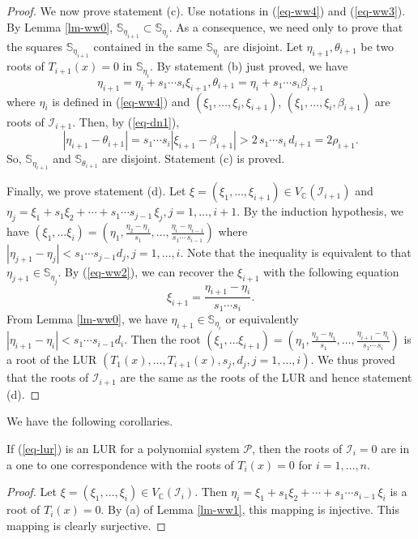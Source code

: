 \documentclass[amsthm]{JSC_LaTex_2007_Mar_12/elsart}
\def\bref#1{(\ref{#1})}
\def\C{{\mathbb{C}}}
\def\PS{ {\mathcal{P}} }
\def\IS{{\mathcal{I}}}
\begin{document}
\begin{proof}
We now prove statement (c).
Use notations in \bref{eq-ww4} and \bref{eq-ww3}. By Lemma
\ref{lm-ww0}, $\mathbb{S}_{\eta_{i+1}}\subset
\mathbb{S}_{\eta_{i}}$.
As a consequence, we need only to prove that the squares
$\mathbb{S}_{\eta_{i+1}}$ contained in the same
$\mathbb{S}_{\eta_{i}}$ are disjoint. Let $\eta_{i+1}, \theta_{i+1}$
be two roots of $T_{i+1}(x)=0$ in $\mathbb{S}_{\eta_{i}}$. By
statement (b) just proved, we have
$$ \eta_{i+1}= \eta_i+s_1\cdots s_{i}\xi_{i+1},
   \theta_{i+1}=\eta_i +s_1\cdots s_{i}\beta_{i+1}$$
where $\eta_i$ is defined in \bref{eq-ww4} and
$(\xi_1,\ldots,\xi_i,\xi_{i+1})$, $(\xi_1,\ldots,\xi_i,\beta_{i+1})$
are roots of $\IS_{i+1}$.   Then, by \bref{eq-dn1},
$$|\eta_{i+1}-\theta_{i+1}|=s_1\cdots s_{i}|\xi_{i+1}-\beta_{i+1}|>2\,s_1\cdots s_{i}\,d_{i+1} = 2\rho_{i+1}.$$
So, $\mathbb{S}_{\eta_{i+1}}$ and $\mathbb{S}_{\theta_{i+1}}$ are
disjoint. Statement (c) is proved.

Finally, we prove statement (d). Let
$\xi=(\xi_1,\ldots,\xi_{i+1})\in V_{\C}(\IS_{i+1})$ and
$\eta_{j}=\xi_1+s_1\xi_2+\cdots+s_1\cdots
 s_{j-1}\,\xi_{j},j=1,\ldots,i+1$. By the induction hypothesis, we
have
$(\xi_1,\ldots\xi_{i})=(\eta_1,\frac{\eta_2-\eta_1}{s_1},\ldots,\frac{\eta_i-\eta_{i-1}}{s_1\cdots\,s_{i-1}})$
where $|\eta_{j+1}-\eta_j|<s_1\cdots s_{j-1}d_j, j=1,\ldots,i$. Note
that the inequality is equivalent to that $\eta_{j+1}\in
\mathbb{S}_{\eta_{j}}$.
By \bref{eq-ww2}, we can recover the $\xi_{i+1}$ with the following
equation
 $$ \xi_{i+1} = \frac{\eta_{i+1}-\eta_{i}}{s_1\cdots s_{i}}.$$
From Lemma \ref{lm-ww0}, we have
$\eta_{i+1}\in\mathbb{S}_{\eta_{i}}$ or equivalently
$|\eta_{i+1}-\eta_{i}| < s_1\cdots s_{i-1}d_{i}$. Then the root
$(\xi_1,\ldots\xi_{i+1})=(\eta_1,\frac{\eta_2-\eta_1}{s_1},\ldots,\frac{\eta_{i+1}-\eta_{i}}{s_1\cdots\,s_{i}})$
is a root of the LUR $(T_1(x),\ldots,T_{i+1}(x), s_j, d_j,
j=1,\dots,i)$. We thus proved that the roots of $\IS_{i+1}$ are the
same as the roots of the LUR and hence statement (d).
\end{proof}

We have the following corollaries.
\begin{cor}\label{cor-l1}
If \bref{eq-lur} is an LUR for a polynomial system $\PS$, then the
roots of $\IS_i=0$ are in a one to one correspondence with the roots
of $T_i(x)=0$ for $i=1,\ldots,n$.
\end{cor}
\begin{proof}
Let $\xi=(\xi_1,\ldots,\xi_{i})\in V_{\C}(\IS_{i})$. Then
$\eta_{i}=\xi_1+s_1\xi_2+\cdots+s_1\cdots
 s_{i-1}\,\xi_{i}$ is a root of $T_i(x)=0$.
By (a) of Lemma \ref{lm-ww1}, this mapping is injective. This
mapping is clearly surjective.
\end{proof}
\end{document}
